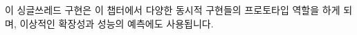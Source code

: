 \fi

이 싱글쓰레드 구현은 이 챕터에서 다양한 동시적 구현들의 프로토타입 역할을 하게
되며, 이상적인 확장성과 성능의 예측에도 사용됩니다.

\IfTwoColumn{}{\FloatBarrier}

\IfTwoColumn{}{\FloatBarrier}





